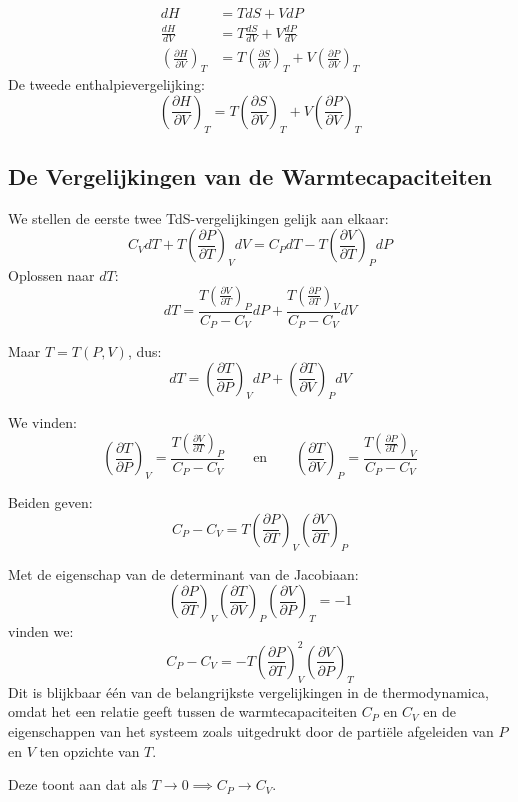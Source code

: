 \begin{align*}
    dH &= TdS + VdP \\
    \frac{dH}{dV} &= T \frac{d S}{d V}+ V \frac{dP}{dV} \\
    \left(\frac{\partial H}{\partial V}\right)_T &= T \left(\frac{\partial S}{\partial V}\right)_T + V \left(\frac{\partial P}{\partial V}\right)_T
\end{align*}
De tweede enthalpievergelijking:
\[\boxed{\left(\frac{\partial H}{\partial V}\right)_T = T \left(\frac{\partial S}{\partial V}\right)_T + V \left(\frac{\partial P}{\partial V}\right)_T}\]


\subsection{De Vergelijkingen van de Warmtecapaciteiten}

We stellen de eerste twee TdS-vergelijkingen gelijk aan elkaar:
\[C_V dT + T\left(\frac{\partial P}{\partial T}\right)_V dV = C_PdT - T\left(\frac{\partial V}{\partial T}\right)_P dP\]
Oplossen naar \(dT\):
\[dT = \frac{T\left(\frac{\partial V}{\partial T}\right)_P }{C_P - C_V}dP + \frac{T\left(\frac{\partial P}{\partial T}\right)_V }{C_P - C_V}dV\]

Maar \(T=T(P,V)\), dus:
\[dT = \left(\frac{\partial T}{\partial P}\right)_V dP + \left(\frac{\partial T}{\partial V}\right)_P dV\]

We vinden:
\[
\left(\frac{\partial T}{\partial P}\right)_V = \frac{T\left(\frac{\partial V}{\partial T}\right)_P }{C_P - C_V}
\qquad\text{en}\qquad
\left(\frac{\partial T}{\partial V}\right)_P = \frac{T\left(\frac{\partial P}{\partial T}\right)_V }{C_P - C_V}
\]

Beiden geven:
\[
C_P - C_V = T \left(\frac{\partial P}{\partial T}\right)_V \left(\frac{\partial V}{\partial T}\right)_P
\]

Met de eigenschap van de determinant van de Jacobiaan:
\[\left(\frac{\partial P}{\partial T}\right)_V \left(\frac{\partial T}{\partial V}\right)_P \left(\frac{\partial V}{\partial P}\right)_T = -1\]
vinden we:
\[\boxed{C_P - C_V = -T \left(\frac{\partial P}{\partial T}\right)_V^2 \left(\frac{\partial V}{\partial P}\right)_T}\]
Dit is blijkbaar één van de belangrijkste vergelijkingen in de thermodynamica, omdat het een relatie geeft tussen de warmtecapaciteiten \(C_P\) en \(C_V\) en de eigenschappen van het systeem zoals uitgedrukt door de partiële afgeleiden van \(P\) en \(V\) ten opzichte van \(T\).

Deze toont aan dat als \(T \to 0 \implies C_P \to C_V\).

